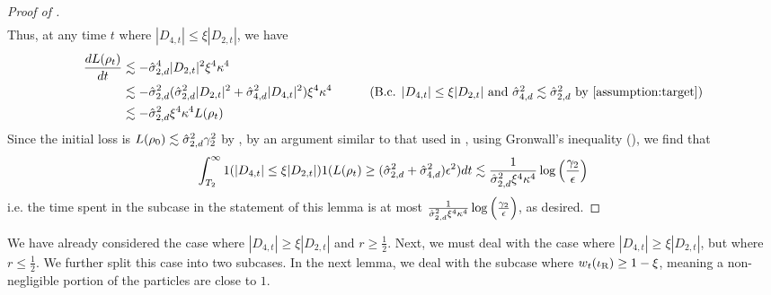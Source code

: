 \begin{proof}[Proof of ]
\begin{align}
\end{align}
Thus, at any time $t$ where $|D_{4, t}| \leq \xi |D_{2, t}|$, we have
\begin{align}
\frac{dL(\rho_t)}{dt}
& \lesssim - \sigmaCoeffTwo^4 |D_{2, t}|^2 \xi^4 \kappa^4 \\
& \lesssim -\sigmaCoeffTwo^2 (\sigmaCoeffTwo^2 |D_{2, t}|^2 + \sigmaCoeffFour^2 |D_{4, t}|^2) \xi^4 \kappa^4
& \tag{B.c. $|D_{4, t}| \leq \xi |D_{2, t}|$ and $\sigmaCoeffFour^2 \lesssim \sigmaCoeffTwo^2$ by \Cref{assumption:target}} \\
& \lesssim - \sigmaCoeffTwo^2 \xi^4 \kappa^4 L(\rho_t)
\end{align}
Since the initial loss is $L(\rho_0) \lesssim \hat{\sigma}_{2, d}^2 \gamma_2^2$ by , by an argument similar to that used in , using Gronwall's inequality (), we find that
\begin{align}
\int_{T_2}^\infty 1(|D_{4, t}| \leq \xi |D_{2, t}|) 1(L(\rho_t) \geq (\hat{\sigma}_{2, d}^2 + \hat{\sigma}_{4, d}^2) \epsilon^2) dt \lesssim \frac{1}{\hat{\sigma}_{2, d}^2 \xi^4 \kappa^4} \log\Big(\frac{\gamma_2}{\epsilon}\Big)
\end{align}
i.e. the time spent in the subcase in the statement of this lemma is at most $\frac{1}{\hat{\sigma}_{2, d}^2 \xi^4 \kappa^4} \log\Big(\frac{\gamma_2}{\epsilon}\Big)$, as desired.
\end{proof}

We have already considered the case where $|D_{4, t}| \geq \xi |D_{2, t}|$ and $r \geq \frac{1}{2}$. Next, we must deal with the case where $|D_{4, t}| \geq \xi |D_{2, t}|$, but where $r \leq \frac{1}{2}$. We further split this case into two subcases. In the next lemma, we deal with the subcase where $w_t(\iota_{\textup{R}}) \geq 1 - \xi$, meaning a non-negligible portion of the particles are close to $1$.

